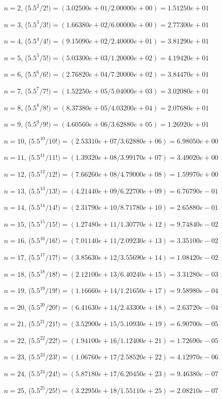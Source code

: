 \documentclass[12pt]{article}
\begin{document}
$n = 2$, ($5.5^{2} / 2!) = (3.02500e+01 / 2.00000e+00) = 1.51250e+01$

$n = 3$, ($5.5^{3} / 3!) = (1.66380e+02 / 6.00000e+00) = 2.77300e+01$

$n = 4$, ($5.5^{4} / 4!) = (9.15090e+02 / 2.40000e+01) = 3.81290e+01$

$n = 5$, ($5.5^{5} / 5!) = (5.03300e+03 / 1.20000e+02) = 4.19420e+01$

$n = 6$, ($5.5^{6} / 6!) = (2.76820e+04 / 7.20000e+02) = 3.84470e+01$

$n = 7$, ($5.5^{7} / 7!) = (1.52250e+05 / 5.04000e+03) = 3.02080e+01$

$n = 8$, ($5.5^{8} / 8!) = (8.37380e+05 / 4.03200e+04) = 2.07680e+01$

$n = 9$, ($5.5^{9} / 9!) = (4.60560e+06 / 3.62880e+05) = 1.26920e+01$

$n = 10$, ($5.5^{10} / 10!) = (2.53310e+07 / 3.62880e+06) = 6.98050e+00$

$n = 11$, ($5.5^{11} / 11!) = (1.39320e+08 / 3.99170e+07) = 3.49020e+00$

$n = 12$, ($5.5^{12} / 12!) = (7.66260e+08 / 4.79000e+08) = 1.59970e+00$

$n = 13$, ($5.5^{13} / 13!) = (4.21440e+09 / 6.22700e+09) = 6.76790e-01$

$n = 14$, ($5.5^{14} / 14!) = (2.31790e+10 / 8.71780e+10) = 2.65880e-01$

$n = 15$, ($5.5^{15} / 15!) = (1.27480e+11 / 1.30770e+12) = 9.74840e-02$

$n = 16$, ($5.5^{16} / 16!) = (7.01140e+11 / 2.09230e+13) = 3.35100e-02$

$n = 17$, ($5.5^{17} / 17!) = (3.85630e+12 / 3.55690e+14) = 1.08420e-02$

$n = 18$, ($5.5^{18} / 18!) = (2.12100e+13 / 6.40240e+15) = 3.31280e-03$

$n = 19$, ($5.5^{19} / 19!) = (1.16660e+14 / 1.21650e+17) = 9.58980e-04$

$n = 20$, ($5.5^{20} / 20!) = (6.41630e+14 / 2.43300e+18) = 2.63720e-04$

$n = 21$, ($5.5^{21} / 21!) = (3.52900e+15 / 5.10930e+19) = 6.90700e-05$

$n = 22$, ($5.5^{22} / 22!) = (1.94100e+16 / 1.12400e+21) = 1.72690e-05$

$n = 23$, ($5.5^{23} / 23!) = (1.06760e+17 / 2.58520e+22) = 4.12970e-06$

$n = 24$, ($5.5^{24} / 24!) = (5.87180e+17 / 6.20450e+23) = 9.46380e-07$

$n = 25$, ($5.5^{25} / 25!) = (3.22950e+18 / 1.55110e+25) = 2.08210e-07$
\end{document}
